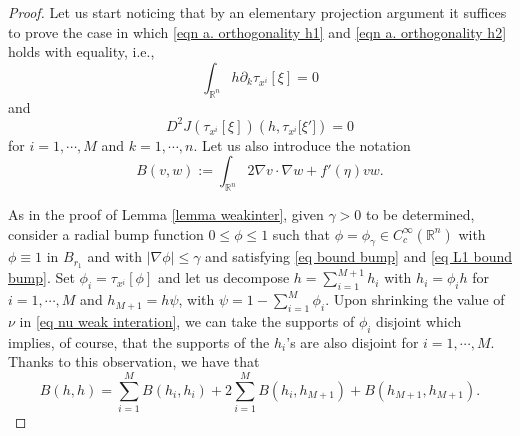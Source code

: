 \documentclass[11pt,letterpaper,reqno]{amsart}
\newcommand{\R}{\mathbb{R}}
\theoremstyle{plain}%
\theoremstyle{definition}
\numberwithin{equation}{section}
\numberwithin{figure}{section}
\begin{document}
\begin{proof}

\medskip

 Let us start noticing that by an elementary projection argument it suffices to prove the case in which \eqref{eqn a. orthogonality h1} and \eqref{eqn a. orthogonality h2} holds with equality, i.e., 
\begin{equation}\label{eqn orthogonality h1}
	\int_{\R^n} h\partial_k\tau_{x^i}[\xi]=0
\end{equation}
and 
\begin{equation}\label{eqn orthogonality h2}
	D^2J(\tau_{x^i}[\xi])(h,\tau_{x^i}\big[\xi'\big])=0
\end{equation}
for $i=1,\cdots, M$ and $k=1,\cdots, n$. Let us also introduce the notation
\begin{equation}\label{eq bilinear M}
	B(v,w):=	\int_{\R^n} 2 \nabla v\cdot \nabla w +f'(\eta) v w.
\end{equation}

As in the proof of Lemma \ref{lemma weakinter}, given $\gamma>0$ to be determined, consider a radial bump function  $0\leq \phi  \leq 1$ such that  $\phi=\phi_{\gamma} \in C_c^\infty(\R^n)$ with $\phi \equiv 1$ in $B_{r_1}$ and with $|\nabla \phi| \leq \gamma$ and satisfying \eqref{eq bound bump} and  \eqref{eq L1 bound bump}. Set $\phi_i=\tau_{x^i}[\phi]$ and let us decompose $h = \sum_{i =1}^{M+1} h_i$ with $h_i =\phi_i h$ for $i=1, \cdots , M$ and $h_{M+1}= h\psi$, with $\psi=1-\sum_{i=1}^M \phi_i$. Upon shrinking the value of $\nu$ in \eqref{eq nu weak interation}, we can take the supports of $\phi_i$ disjoint which implies, of course, that the supports of the $h_i$'s are also disjoint for $i=1,\cdots, M$. Thanks to this observation, we have that 
\begin{equation}\label{eq decomp bilinear}
	B(h,h)= \sum_{i=1}^{M} B(h_i,h_i)+ 2\sum_{i=1}^{M}B(h_{i},h_{M+1})+B(h_{M+1},h_{M+1}).
\end{equation}

\medskip




\end{proof}
\end{document}
